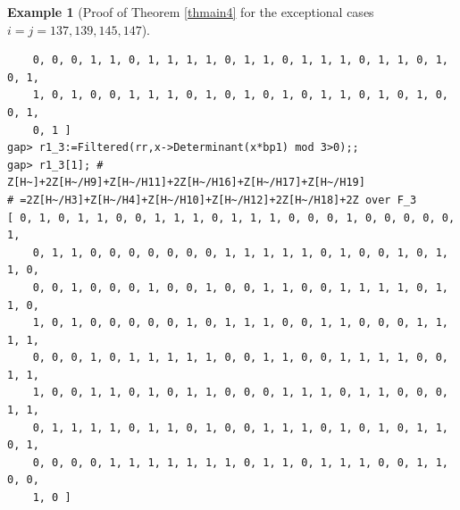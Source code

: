 \documentclass{amsart}
\theoremstyle{plain}
\theoremstyle{definition}
\newtheorem{example}[theorem]{Example}
\theoremstyle{remark}
\begin{document}
\begin{example}[Proof of {Theorem \ref{thmain4}} for the exceptional cases $i=j=137,139,145,147$]
\begin{verbatim}
    0, 0, 0, 1, 1, 0, 1, 1, 1, 1, 0, 1, 1, 0, 1, 1, 1, 0, 1, 1, 0, 1, 0, 1, 
    1, 0, 1, 0, 0, 1, 1, 1, 0, 1, 0, 1, 0, 1, 0, 1, 1, 0, 1, 0, 1, 0, 0, 1, 
    0, 1 ]
gap> r1_3:=Filtered(rr,x->Determinant(x*bp1) mod 3>0);;
gap> r1_3[1]; # Z[H~]+2Z[H~/H9]+Z[H~/H11]+2Z[H~/H16]+Z[H~/H17]+Z[H~/H19]
# =2Z[H~/H3]+Z[H~/H4]+Z[H~/H10]+Z[H~/H12]+2Z[H~/H18]+2Z over F_3
[ 0, 1, 0, 1, 1, 0, 0, 1, 1, 1, 0, 1, 1, 1, 0, 0, 0, 1, 0, 0, 0, 0, 0, 1, 
    0, 1, 1, 0, 0, 0, 0, 0, 0, 0, 1, 1, 1, 1, 1, 0, 1, 0, 0, 1, 0, 1, 1, 0, 
    0, 0, 1, 0, 0, 0, 1, 0, 0, 1, 0, 0, 1, 1, 0, 0, 1, 1, 1, 1, 0, 1, 1, 0, 
    1, 0, 1, 0, 0, 0, 0, 0, 1, 0, 1, 1, 1, 0, 0, 1, 1, 0, 0, 0, 1, 1, 1, 1, 
    0, 0, 0, 1, 0, 1, 1, 1, 1, 1, 0, 0, 1, 1, 0, 0, 1, 1, 1, 1, 0, 0, 1, 1, 
    1, 0, 0, 1, 1, 0, 1, 0, 1, 1, 0, 0, 0, 1, 1, 1, 0, 1, 1, 0, 0, 0, 1, 1, 
    0, 1, 1, 1, 1, 0, 1, 1, 0, 1, 0, 0, 1, 1, 1, 0, 1, 0, 1, 0, 1, 1, 0, 1, 
    0, 0, 0, 0, 1, 1, 1, 1, 1, 1, 1, 0, 1, 1, 0, 1, 1, 1, 0, 0, 1, 1, 0, 0, 
    1, 0 ]


\end{verbatim}
\end{example}
\end{document}

